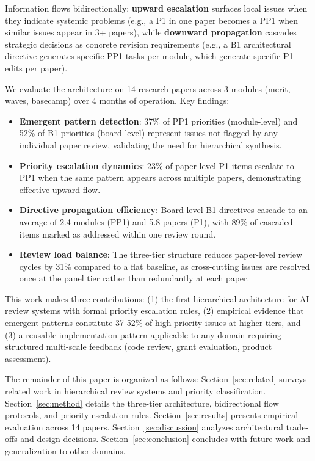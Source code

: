 Information flows bidirectionally: \textbf{upward escalation} surfaces local issues when they indicate systemic problems (e.g., a P1 in one paper becomes a PP1 when similar issues appear in 3+ papers), while \textbf{downward propagation} cascades strategic decisions as concrete revision requirements (e.g., a B1 architectural directive generates specific PP1 tasks per module, which generate specific P1 edits per paper).

We evaluate the architecture on 14 research papers across 3 modules (merit, waves, basecamp) over 4 months of operation. Key findings:

\begin{itemize}
\item \textbf{Emergent pattern detection}: 37\% of PP1 priorities (module-level) and 52\% of B1 priorities (board-level) represent issues not flagged by any individual paper review, validating the need for hierarchical synthesis.

\item \textbf{Priority escalation dynamics}: 23\% of paper-level P1 items escalate to PP1 when the same pattern appears across multiple papers, demonstrating effective upward flow.

\item \textbf{Directive propagation efficiency}: Board-level B1 directives cascade to an average of 2.4 modules (PP1) and 5.8 papers (P1), with 89\% of cascaded items marked as addressed within one review round.

\item \textbf{Review load balance}: The three-tier structure reduces paper-level review cycles by 31\% compared to a flat baseline, as cross-cutting issues are resolved once at the panel tier rather than redundantly at each paper.
\end{itemize}

This work makes three contributions: (1) the first hierarchical architecture for AI review systems with formal priority escalation rules, (2) empirical evidence that emergent patterns constitute 37-52\% of high-priority issues at higher tiers, and (3) a reusable implementation pattern applicable to any domain requiring structured multi-scale feedback (code review, grant evaluation, product assessment).

The remainder of this paper is organized as follows: Section~\ref{sec:related} surveys related work in hierarchical review systems and priority classification. Section~\ref{sec:method} details the three-tier architecture, bidirectional flow protocols, and priority escalation rules. Section~\ref{sec:results} presents empirical evaluation across 14 papers. Section~\ref{sec:discussion} analyzes architectural trade-offs and design decisions. Section~\ref{sec:conclusion} concludes with future work and generalization to other domains.
